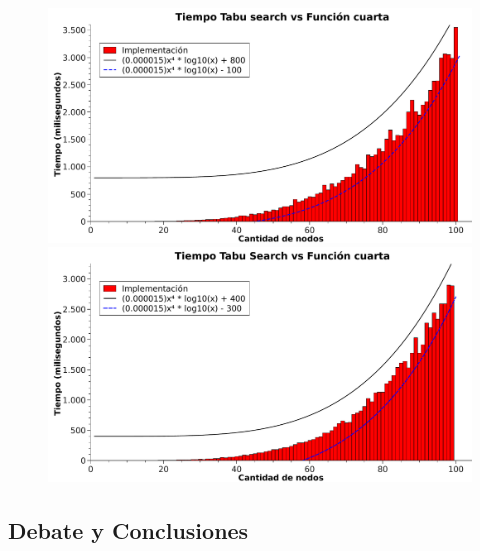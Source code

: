 \begin{figure}[htb]
\begin{minipage}{\textwidth}
\begin{center}
	\includegraphics[width=\textwidth]{./otros/graficos/tiempo_100nodos3_ej5.pdf}
	\caption{}
	\label{ej5tiempo3}
\end{center}
\end{minipage}

\begin{minipage}{\textwidth}
\begin{center}
	\includegraphics[width=\textwidth]{./otros/graficos/tiempo_100nodos4_ej5.pdf}
	\caption{}
	\label{ej5tiempo4}
\end{center}
\end{minipage}
\end{figure}

\subsection{Debate y Conclusiones}
